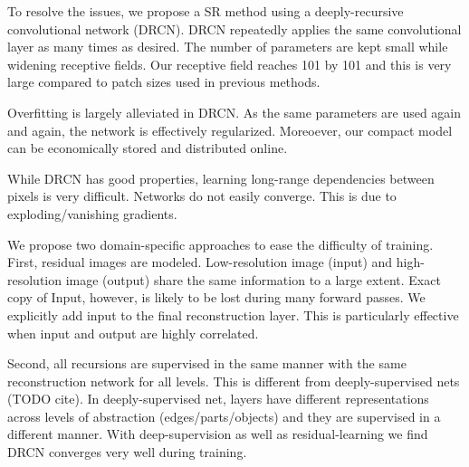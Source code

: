 \documentclass[10pt,twocolumn,letterpaper]{article}
\begin{document}
To resolve the issues, we propose a SR method using a deeply-recursive convolutional network (DRCN). DRCN repeatedly applies the same convolutional layer as many times as desired. The number of parameters are kept small while widening receptive fields. Our receptive field reaches 101 by 101 and this is very large compared to patch sizes used in previous methods. 

Overfitting is largely alleviated in DRCN. As the same parameters are used again and again, the network is effectively regularized. Moreoever, our compact model can be economically stored and distributed online.   

While DRCN has good properties, learning long-range dependencies between pixels is very difficult. Networks do not easily converge. This is due to exploding/vanishing gradients. 

We propose two domain-specific approaches to ease the difficulty of training. First, residual images are modeled. Low-resolution image (input) and high-resolution image (output) share the same information to a large extent. Exact copy of Input, however, is likely to be lost during many forward passes. We explicitly add input to the final reconstruction layer. This is particularly effective when input and output are highly correlated. 


%
%

Second, all recursions are supervised in the same manner with the same reconstruction network for all levels. This is different from deeply-supervised nets (TODO cite). In deeply-supervised net, layers have different representations across levels of abstraction (edges/parts/objects) and they are supervised in a different manner. With deep-supervision as well as residual-learning we find DRCN converges very well during training. 
\end{document}
